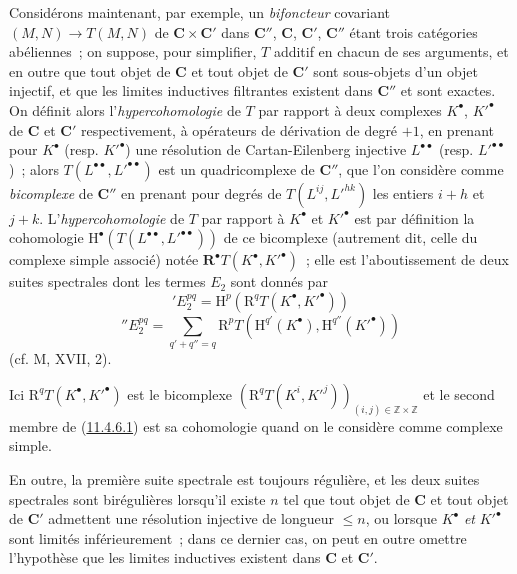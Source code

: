 \begin{env}[11.4.6]
\label{0.11.4.6-fr}
Considérons maintenant, par exemple, un \emph{bifoncteur} covariant
$(M,N)\to T(M,N)$ de $\boldsymbol{C}\times\boldsymbol{C}'$ dans $\boldsymbol{C}''$,
$\boldsymbol{C}$, $\boldsymbol{C}'$, $\boldsymbol{C}''$ étant trois catégories
abéliennes~; on suppose, pour simplifier, $T$ additif en chacun de ses
arguments, et en outre que tout objet de $\boldsymbol{C}$ et tout objet de
$\boldsymbol{C}'$ sont sous-objets d'un objet injectif, et que les limites
inductives filtrantes existent dans $\boldsymbol{C}''$ et sont exactes. On définit
alors l'\emph{hypercohomologie} de $T$ par rapport à deux complexes
$K^\bullet$, $K'^\bullet$ de $\boldsymbol{C}$ et $\boldsymbol{C}'$ respectivement, à
opérateurs de dérivation de degré $+1$, en prenant pour $K^\bullet$ (resp.
$K'^\bullet$) une résolution de Cartan-Eilenberg injective
$L^{\bullet\bullet}$ (resp. $L'^{\bullet\bullet}$)~; alors
$T(L^{\bullet\bullet},L'^{\bullet\bullet})$ est un quadricomplexe de
$\boldsymbol{C}''$, que l'on considère comme \emph{bicomplexe} de $\boldsymbol{C}''$
en prenant pour degrés de $T(L^{ij},L'^{hk})$ les entiers $i+h$ et $j+k$.
L'\emph{hypercohomologie} de $T$ par rapport à $K^\bullet$ et $K'^\bullet$
est par définition la cohomologie
$\mathrm H^\bullet(T(L^{\bullet\bullet},L'^{\bullet\bullet}))$ de ce
bicomplexe (autrement dit, celle du complexe simple associé)
notée
$\mathbf R^\bullet T(K^\bullet,K'^\bullet)$~; elle est l'aboutissement de
deux suites spectrales dont les termes $E_2$ sont donnés par
\[
  \label{0.11.4.6.1-fr}
  'E_2^{pq}=\mathrm H^p(\mathrm R^qT(K^\bullet,K'^\bullet))
  \tag{11.4.6.1}
\]
\[
  \label{0.11.4.6.2-fr}
  ''E_2^{pq}=\sum_{q'+q''=q}
  \mathrm R^pT(\mathrm H^{q'}(K^\bullet),\mathrm H^{q''}(K'^\bullet))
  \tag{11.4.6.2}
\]
(cf. M, XVII, 2).

Ici $\mathrm R^qT(K^\bullet,K'^\bullet)$ est le bicomplexe
$(\mathrm R^qT(K^i,K'^j))_{(i,j)\in\mathbb Z\times\mathbb Z}$ et le second
membre de (\hyperref[0.11.4.6.1-fr]{11.4.6.1}) est sa cohomologie quand on le
considère comme complexe simple.

En outre, la première suite spectrale est toujours régulière, et les deux
suites spectrales sont birégulières lorsqu'il existe $n$ tel que tout objet de
$\boldsymbol{C}$ et tout objet de $\boldsymbol{C}'$ admettent une résolution injective
de longueur $\leq n$, ou lorsque $K^\bullet$ \emph{et} $K'^\bullet$ sont limités
inférieurement~; dans ce dernier cas, on peut en outre omettre l'hypothèse que
les limites inductives existent dans $\boldsymbol{C}$ et $\boldsymbol{C}'$.


\end{env}
